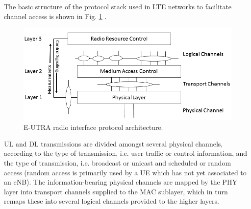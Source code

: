 The basic structure of the protocol stack used in LTE networks to facilitate channel access is shown in Fig. \ref{figs:stack} \cite{tr36201}.
\begin{figure}[!ht]	
	\includegraphics[width=\textwidth]{figs/LTEradio-interface}
	\caption{E-UTRA radio interface protocol architecture.}
	\label{figs:stack}
\end{figure}
UL and DL transmissions are divided amongst several physical channels, according to the type of transmission, i.e. user traffic or control information, and the type of transmission, i.e. broadcast or unicast and scheduled or random access (random access is primarily used by a UE which has not yet associated to an eNB). The information-bearing physical channels are mapped by the PHY layer into transport channels supplied to the MAC sublayer, which in turn remaps these into several logical channels provided to the higher layers. 

